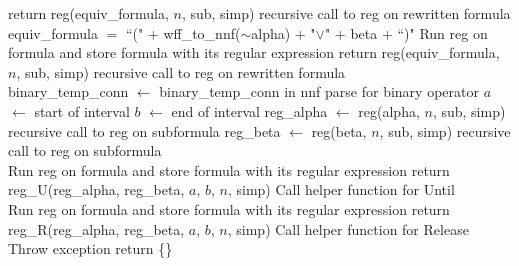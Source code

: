 \documentclass[runningheads]{llncs}
\begin{document}
\begin{algorithm}[H]
\begin{algorithmic}
            \EndIf
            \State return reg(equiv\_formula, $n$, sub, simp)
            \Comment recursive call to reg on rewritten formula
        \EndIf\\
            \State equiv\_formula $=$ ``(" + wff\_to\_nnf($\scriptstyle{\sim}$alpha) + "$\lor$" + beta + ``)"
                \State Run reg on formula and store formula with its regular expression
            \EndIf
            \State return reg(equiv\_formula, $n$, sub, simp)
            \Comment recursive call to reg on rewritten formula
        \EndIf
    \EndIf\\
        \State binary\_temp\_conn $\leftarrow$ binary\_temp\_conn in nnf
        \Comment parse for binary operator
        \State $a$ $\leftarrow$ start of interval
        \State $b$ $\leftarrow$ end of interval
        \State reg\_alpha $\leftarrow$ reg(alpha, $n$, sub, simp)
        \Comment recursive call to reg on subformula
        \State reg\_beta $\leftarrow$ reg(beta, $n$, sub, simp)
        \Comment recursive call to reg on subformula
        \\
                \State Run reg on formula and store formula with its regular expression
            \EndIf
            \State return reg\_U(reg\_alpha, reg\_beta, $a$, $b$, $n$, simp)
            \Comment Call helper function for Until\\
                \State Run reg on formula and store formula with its regular expression
            \EndIf
            \State return reg\_R(reg\_alpha, reg\_beta, $a$, $b$, $n$, simp)
            \Comment Call helper function for Release
        \EndIf
    \EndIf\\
    \State Throw exception 
    \State return \{\}
\EndProcedure
\end{algorithmic}
\end{algorithm}
\end{document}
